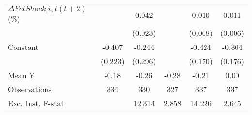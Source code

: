 {\begin{tabular}{l*{5}{c}}
\addlinespace
$ \Delta FctShock\_{i,t}(t+2)$ (\%)&                     &       0.042\sym{*}  &                     &       0.010         &       0.011\sym{*}  \\
                    &                     &     (0.023)         &                     &     (0.008)         &     (0.006)         \\
\addlinespace
Constant            &      -0.407\sym{*}  &      -0.244         &                     &      -0.424\sym{**} &      -0.304\sym{*}  \\
                    &     (0.223)         &     (0.296)         &                     &     (0.170)         &     (0.176)         \\
\midrule
Mean Y              &       -0.18         &       -0.26         &       -0.28         &       -0.21         &        0.00         \\
Observations        &         334         &         330         &         327         &         337         &         337         \\
Exc. Inst. F-stat   &                     &      12.314         &       2.858         &      14.226         &       2.645         \\
\bottomrule
\end{tabular}
}
